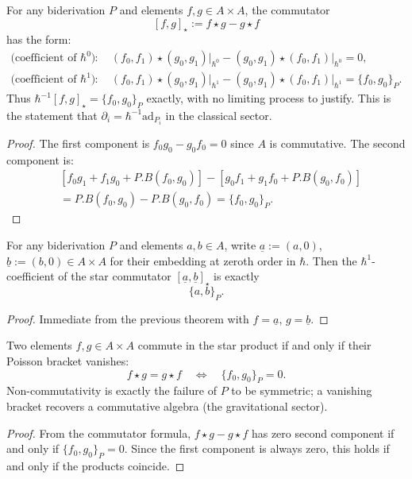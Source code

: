 \begin{theorem}
For any biderivation $P$ and elements $f, g \in A \times A$, the commutator
\[
[f, g]_\star := f \star g - g \star f
\]
has the form:
\begin{align}
\text{(coefficient of $\hbar^0$)} &: \quad (f_0, f_1) \star (g_0, g_1) \big|_{\hbar^0} - (g_0, g_1) \star (f_0, f_1) \big|_{\hbar^0} = 0 , \\
\text{(coefficient of $\hbar^1$)} &: \quad (f_0, f_1) \star (g_0, g_1) \big|_{\hbar^1} - (g_0, g_1) \star (f_0, f_1) \big|_{\hbar^1} = \{f_0, g_0\}_P .
\end{align}
Thus $\hbar^{-1}[f, g]_\star = \{f_0, g_0\}_P$ exactly, with no limiting process to justify. This is the statement that $\partial_i = \hbar^{-1} \text{ad}_{P_i}$ in the classical sector.
\begin{proof}
The first component is $f_0 g_0 - g_0 f_0 = 0$ since $A$ is commutative. The second component is:
\begin{align}
&[f_0 g_1 + f_1 g_0 + P.B(f_0, g_0)] - [g_0 f_1 + g_1 f_0 + P.B(g_0, f_0)] \\
&= P.B(f_0, g_0) - P.B(g_0, f_0) = \{f_0, g_0\}_P .
\end{align}
\end{proof}
\end{theorem}

\begin{theorem}
For any biderivation $P$ and elements $a, b \in A$, write $\underline{a} := (a,0)$, $\underline{b} := (b,0) \in A \times A$ for their embedding at zeroth order in $\hbar$. Then the $\hbar^1$-coefficient of the star commutator $[\underline{a},\underline{b}]_\star$ is exactly
\[
\{a,b\}_P .
\]
\begin{proof}
Immediate from the previous theorem with $f = \underline{a}$, $g = \underline{b}$.
\end{proof}
\end{theorem}

\begin{theorem}
Two elements $f, g \in A \times A$ commute in the star product if and only if their Poisson bracket vanishes:
\[
f \star g = g \star f \quad \iff \quad \{f_0, g_0\}_P = 0 .
\]
Non-commutativity is exactly the failure of $P$ to be symmetric; a vanishing bracket recovers a commutative algebra (the gravitational sector).
\begin{proof}
From the commutator formula, $f \star g - g \star f$ has zero second component if and only if $\{f_0, g_0\}_P = 0$. Since the first component is always zero, this holds if and only if the products coincide.
\end{proof}
\end{theorem}

